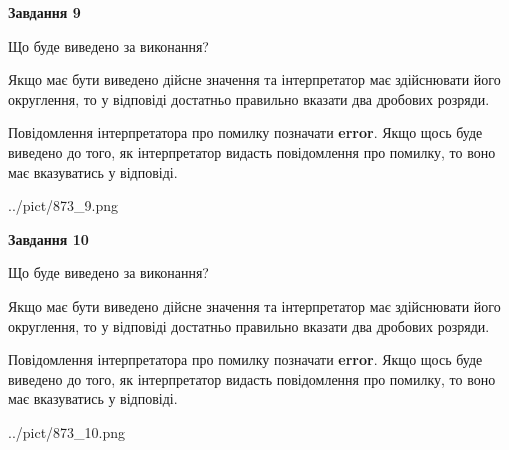 \documentclass[12pt, ukrainian]{article}
\begin{document}
{\begin {Large}
{\begin {center}\textbf{Завдання 9}\end {center}}\par
Що буде виведено за виконання? \par

Якщо має бути виведено дійсне значення та інтерпретатор має здійснювати його округлення, 
то у відповіді достатньо правильно вказати два дробових розряди.

Повідомлення інтерпретатора про помилку позначати \textbf{error}.
Якщо щось буде виведено до того, як інтерпретатор видасть повідомлення про помилку, 
то воно має вказуватись у відповіді. \par

\begin{center}
	{../pict/873_9.png}
\end{center}
\newpage

{\begin {center}\textbf{Завдання 10}\end {center}}\par
Що буде виведено за виконання? \par

Якщо має бути виведено дійсне значення та інтерпретатор має здійснювати його округлення, 
то у відповіді достатньо правильно вказати два дробових розряди.

Повідомлення інтерпретатора про помилку позначати \textbf{error}.
Якщо щось буде виведено до того, як інтерпретатор видасть повідомлення про помилку, 
то воно має вказуватись у відповіді. \par

\begin{center}
	{../pict/873_10.png}
\end{center}
\newpage

\end {Large}}
\end{document}

